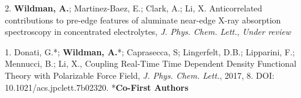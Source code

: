 


\begin{cvpublications}


\cvpublication
{2.} 
{\textbf{Wildman, A.}; Martinez-Baez, E.; Clark, A.; Li, X. Anticorrelated
contributions to pre-edge features of aluminate near-edge X-ray absorption
spectroscopy in concentrated electrolytes, \textit{J. Phys. Chem. Lett.},
\textit{Under review}} 


\cvpublication
{1.}
{Donati, G.*; \textbf{Wildman, A.}*; Caprasecca, S; Lingerfelt, D.B.; Lipparini,
F.; Mennucci, B.; Li, X., Coupling Real-Time Time Dependent Density Functional
Theory with Polarizable Force Field, \textit{J. Phys. Chem. Lett.}, 2017, 8.
DOI: 10.1021/acs.jpclett.7b02320. *\textbf{Co-First Authors}}



\end{cvpublications}
\vspace{-1cm}

